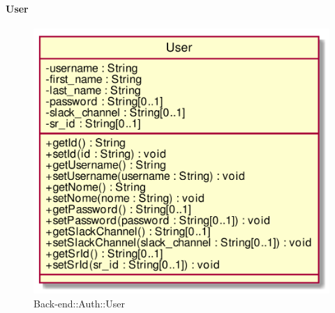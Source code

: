 \hypertarget{User_label}{\paragraph{User}}
\begin{figure}[h]
	\centering
	\includegraphics[width=\textwidth,height=\textheight,keepaspectratio]{images/ClassUser.png}
	\caption{Back-end::Auth::User}
\end{figure}
